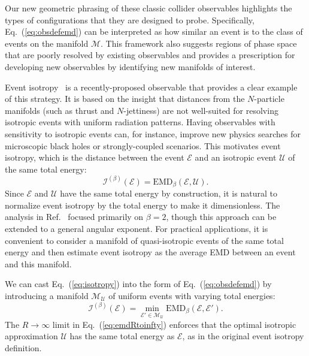 \documentclass[letterpaper,11pt]{article}
\DeclareRobustCommand{\Eq}[1]{Eq.~(\ref{#1})}
\DeclareRobustCommand{\Ref}[1]{Ref.~\cite{#1}}
\begin{document}
Our new geometric phrasing of these classic collider observables highlights the types of configurations that they are designed to probe.
%
Specifically, \Eq{eq:obsdefemd} can be interpreted as how similar an event is to the class of events on the manifold $\mathcal{M}$.
%
This framework also suggests regions of phase space that are poorly resolved by existing observables and provides a prescription for developing new observables by identifying new manifolds of interest.


Event isotropy~\cite{isotropytemp} is a recently-proposed observable that provides a clear example of this strategy.
%
It is based on the insight that distances from the $N$-particle manifolds (such as thrust and $N$-jettiness) are not well-suited for resolving isotropic events with uniform radiation patterns.
%
Having observables with sensitivity to isotropic events can, for instance, improve new physics searches for microscopic black holes or strongly-coupled scenarios.
%
This motivates event isotropy, which is the distance between the event $\mathcal E$ and an isotropic event $\mathcal U$ of the same total energy:
%
\begin{equation}\label{eq:isotropy}
\mathcal I^{(\beta)}(\mathcal E) =  \text{EMD}_{\beta}(\mathcal E, \mathcal{U}).
\end{equation}
%
Since $\mathcal E$ and $\mathcal{U}$ have the same total energy by construction, it is natural to normalize event isotropy by the total energy to make it dimensionless.
%
The analysis in \Ref{isotropytemp} focused primarily on $\beta = 2$, though this approach can be extended to a general angular exponent.
%
For practical applications, it is convenient to consider a manifold of quasi-isotropic events of the same total energy and then estimate event isotropy as the average EMD between an event and this manifold. 


We can cast \Eq{eq:isotropy} into the form of \Eq{eq:obsdefemd} by introducing a manifold $\mathcal M_{\mathcal U}$ of uniform events with varying total energies:
%
\begin{equation}\label{eq:isotropy_emd}
\boxed{
\mathcal I^{(\beta)}(\mathcal E) = \min_{\mathcal{E}' \in \mathcal M_{\mathcal U}} \text{EMD}_{\beta}(\mathcal E, \mathcal{E}').
}
\end{equation}
%
The $R \to \infty$ limit in \Eq{eq:emdRtoinfty} enforces that the optimal isotropic approximation $\mathcal{U}$ has the same total energy as $\mathcal E$, as in the original event isotropy definition.
\end{document}
